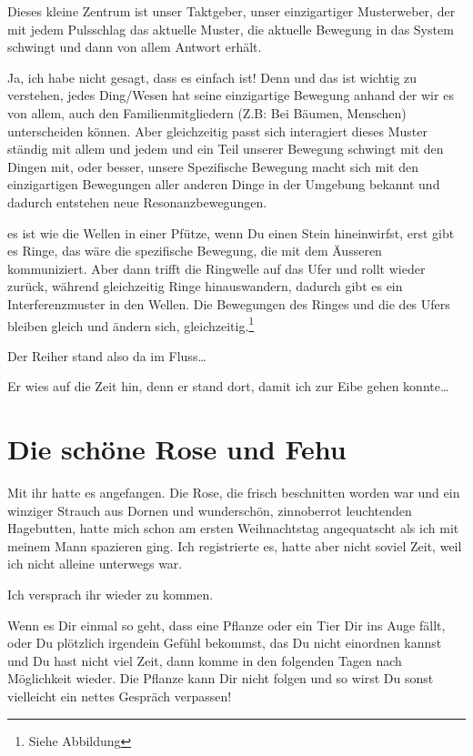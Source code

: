 \documentclass[11pt,titlepage,a5paper]{book}
\begin{document}
Dieses kleine Zentrum ist unser Taktgeber, unser einzigartiger Musterweber, der mit jedem Pulsschlag das aktuelle Muster, die aktuelle Bewegung in das System schwingt und dann von allem Antwort erhält.

Ja, ich habe nicht gesagt, dass es einfach ist! Denn und das ist wichtig zu verstehen, jedes Ding/Wesen hat seine einzigartige Bewegung anhand der wir es von allem, auch den Familienmitgliedern (Z.B: Bei Bäumen, Menschen) unterscheiden können. Aber gleichzeitig passt sich interagiert dieses Muster ständig mit allem und jedem und ein Teil unserer Bewegung schwingt mit den Dingen mit, oder besser, unsere Spezifische Bewegung macht sich mit den einzigartigen Bewegungen aller anderen Dinge in der Umgebung bekannt und dadurch entstehen neue Resonanzbewegungen.

es ist wie die Wellen in einer Pfütze, wenn Du einen Stein hineinwirfst, erst gibt es Ringe, das wäre die spezifische Bewegung, die mit dem Äusseren kommuniziert. Aber dann trifft die Ringwelle auf das Ufer und rollt wieder zurück, während gleichzeitig Ringe hinauswandern, dadurch gibt es ein Interferenzmuster in den Wellen. Die Bewegungen des Ringes und die des Ufers bleiben gleich und ändern sich, gleichzeitig.\footnote{Siehe Abbildung}

Der Reiher stand also da im Fluss\dots

Er wies auf die Zeit hin, denn er stand dort, damit ich zur Eibe gehen konnte\dots




 
\section{Die schöne Rose und Fehu  }

Mit ihr hatte es angefangen. Die Rose, die frisch beschnitten worden war und ein winziger Strauch aus Dornen und wunderschön, zinnoberrot leuchtenden Hagebutten, hatte mich schon am ersten Weihnachtstag angequatscht als ich mit meinem Mann spazieren ging. Ich registrierte es, hatte aber nicht soviel Zeit, weil ich nicht alleine unterwegs war.

Ich versprach ihr wieder zu kommen. 

Wenn es Dir einmal so geht, dass eine Pflanze  oder ein Tier Dir ins Auge fällt, oder Du plötzlich irgendein Gefühl bekommst, das Du nicht einordnen kannst und Du hast nicht viel Zeit, dann komme in den folgenden Tagen nach Möglichkeit wieder. Die Pflanze kann Dir nicht folgen und so wirst Du sonst vielleicht ein nettes Gespräch verpassen! 
\end{document}
